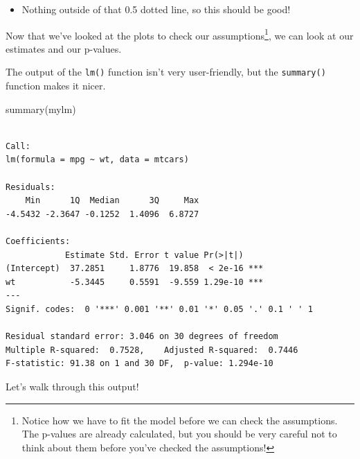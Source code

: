 \documentclass[
  letterpaper,
  DIV=11,
  numbers=noendperiod,
  oneside]{scrreprt}
\newenvironment{Shaded}{\begin{snugshade}}{\end{snugshade}}
\newcommand{\FunctionTok}[1]{\textcolor[rgb]{0.28,0.35,0.67}{#1}}
\newcommand{\NormalTok}[1]{\textcolor[rgb]{0.00,0.23,0.31}{#1}}
\providecommand{\tightlist}{%
  \setlength{\itemsep}{0pt}\setlength{\parskip}{0pt}}\usepackage{longtable,booktabs,array}
\begin{document}
\begin{enumerate}
  \begin{itemize}
  \tightlist
  \item
    Nothing outside of that 0.5 dotted line, so this should be good!
  \end{itemize}
\end{enumerate}

Now that we've looked at the plots to check our assumptions\footnote{Notice
  how we have to fit the model before we can check the assumptions. The
  p-values are already calculated, but you should be very careful not to
  think about them before you've checked the assumptions!}, we can look
at our estimates and our p-values.

The output of the \texttt{lm()} function isn't very user-friendly, but
the \texttt{summary()} function makes it nicer.

\begin{Shaded}
\begin{Highlighting}[]
\FunctionTok{summary}\NormalTok{(mylm)}
\end{Highlighting}
\end{Shaded}

\begin{verbatim}

Call:
lm(formula = mpg ~ wt, data = mtcars)

Residuals:
    Min      1Q  Median      3Q     Max 
-4.5432 -2.3647 -0.1252  1.4096  6.8727 

Coefficients:
            Estimate Std. Error t value Pr(>|t|)    
(Intercept)  37.2851     1.8776  19.858  < 2e-16 ***
wt           -5.3445     0.5591  -9.559 1.29e-10 ***
---
Signif. codes:  0 '***' 0.001 '**' 0.01 '*' 0.05 '.' 0.1 ' ' 1

Residual standard error: 3.046 on 30 degrees of freedom
Multiple R-squared:  0.7528,    Adjusted R-squared:  0.7446 
F-statistic: 91.38 on 1 and 30 DF,  p-value: 1.294e-10
\end{verbatim}

Let's walk through this output!
\end{document}
